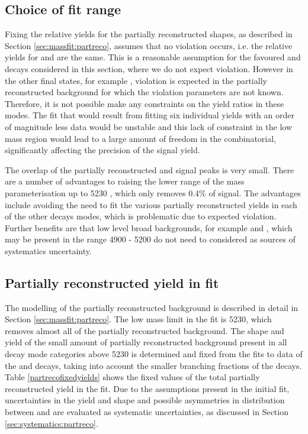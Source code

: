 \subsection{Choice of fit range}
\label{sec:cpfit:range}	

Fixing the relative yields for the partially reconstructed shapes, as described in Section \ref{sec:massfit:partreco}, assumes that no \CP violation occurs, i.e. the relative yields for \Bm and \Bp are the same. This is a reasonable assumption for the favoured \kpi and \kpipipi decays considered in this section, where we do not expect \CP violation. However in the other \Dz final states, for example \pik, \CP violation is expected in the partially reconstructed background for which the \CP violation parameters are not known. Therefore, it is not possible make any constraints on the yield ratios in these modes. The fit that would result from fitting six individual yields with an order of magnitude less data would be unstable and this lack of constraint in the low mass region would lead to a large amount of freedom in the combinatorial, significantly affecting the precision of the signal yield. 

The overlap of the partially reconstructed and signal peaks is very small. There are a number of advantages to raising the lower range of the mass parameterisation up to 5230 \mev, which only removes 0.4\% of signal. The advantages include avoiding the need to fit the various partially reconstructed yields in each of the other \Dz decays modes, which is problematic due to expected \CP violation. Further benefits are that low level broad backgrounds, for example \decay{\Bm}{\D\Kstarm\piz} and \decay{\Bd}{\Kp\pim\pip\pim}, which may be present in the range 4900 - 5200 \mev do not need to considered as sources of systematics uncertainty. 

\subsection{Partially reconstructed yield in \CP fit}
\label{sec:cpfit:partrecoyields}

The modelling of the partially reconstructed background is described in detail in Section \ref{sec:massfit:partreco}. The low mass limit in the \CP fit is 5230\mevcc, which removes almost all of the partially reconstructed background. The shape and yield of the small amount of partially reconstructed background present in all \Dz decay mode categories above 5230 \mev is determined and fixed from the fits to data of the \kpi and \kpipipi decays, taking into account the smaller branching fractions of the \Dz decays. Table \ref{partrecofixedyields} shows the fixed values of the total partially reconstructed yield in the \CP fit. Due to the assumptions present in the initial fit, uncertainties in the yield and shape and possible asymmetries in distribution between \Bp and \Bm are evaluated as systematic uncertainties, as discussed in Section \ref{sec:systematics:partreco}. 

